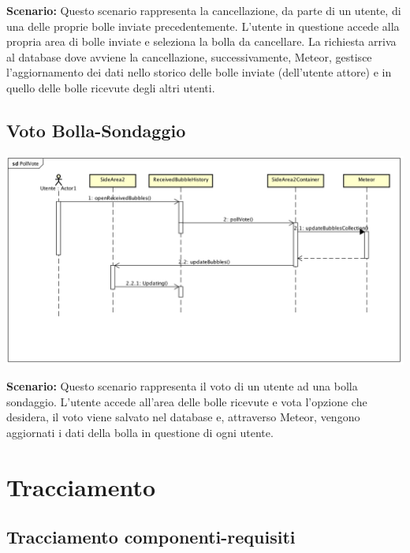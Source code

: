 \textbf{Scenario:} 
Questo scenario rappresenta la cancellazione, da parte di un utente, di una delle proprie bolle 	inviate precedentemente. L’utente in questione accede alla propria area di bolle inviate e 	seleziona la bolla da cancellare. La richiesta arriva al database dove avviene la cancellazione, 	successivamente, Meteor, gestisce l’aggiornamento dei dati nello storico delle bolle inviate 	(dell’utente attore) e in quello delle bolle ricevute degli altri utenti. 
\newpage

\subsection{Voto Bolla-Sondaggio}

\begin{center}
	\includegraphics[scale=0.4]{img/PollVote.png}
\end{center}



\textbf{Scenario:} 
Questo scenario rappresenta il voto di un utente ad una bolla sondaggio.
L’utente accede all’area delle bolle ricevute e vota l’opzione che desidera, il voto viene salvato 	nel database e, attraverso Meteor, vengono aggiornati i dati della bolla in questione di ogni 	utente. \\

\section{Tracciamento}

\subsection{Tracciamento componenti-requisiti}

